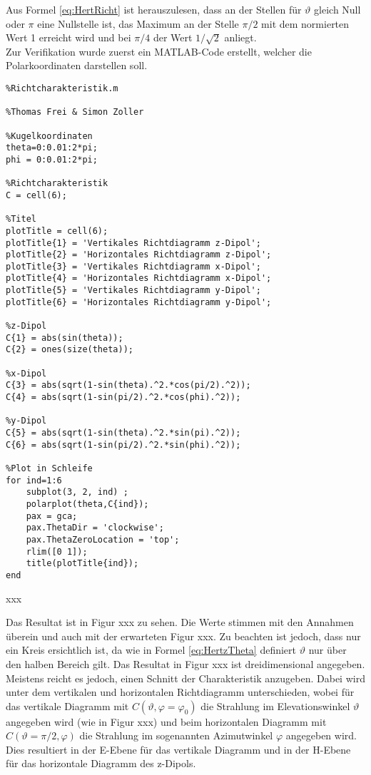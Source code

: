 Aus Formel \ref{eq:HertRicht} ist herauszulesen, dass an der Stellen für $\vartheta$ gleich Null oder $\pi$ eine Nullstelle ist, das Maximum an der Stelle $\pi/2$ mit dem normierten Wert 1 erreicht wird und bei $\pi/4$ der Wert $1/\sqrt{2}$ anliegt.\\

Zur Verifikation wurde zuerst ein MATLAB-Code erstellt, welcher die Polarkoordinaten darstellen soll.

\begin{lstlisting}
%Richtcharakteristik.m

%Thomas Frei & Simon Zoller

%Kugelkoordinaten
theta=0:0.01:2*pi;
phi = 0:0.01:2*pi;

%Richtcharakteristik
C = cell(6);

%Titel
plotTitle = cell(6);
plotTitle{1} = 'Vertikales Richtdiagramm z-Dipol';
plotTitle{2} = 'Horizontales Richtdiagramm z-Dipol';
plotTitle{3} = 'Vertikales Richtdiagramm x-Dipol';
plotTitle{4} = 'Horizontales Richtdiagramm x-Dipol';
plotTitle{5} = 'Vertikales Richtdiagramm y-Dipol';
plotTitle{6} = 'Horizontales Richtdiagramm y-Dipol';

%z-Dipol
C{1} = abs(sin(theta));
C{2} = ones(size(theta));

%x-Dipol
C{3} = abs(sqrt(1-sin(theta).^2.*cos(pi/2).^2));
C{4} = abs(sqrt(1-sin(pi/2).^2.*cos(phi).^2));

%y-Dipol
C{5} = abs(sqrt(1-sin(theta).^2.*sin(pi).^2));
C{6} = abs(sqrt(1-sin(pi/2).^2.*sin(phi).^2));

%Plot in Schleife
for ind=1:6
    subplot(3, 2, ind) ;
    polarplot(theta,C{ind});
    pax = gca;
    pax.ThetaDir = 'clockwise';
    pax.ThetaZeroLocation = 'top';
    rlim([0 1]);
    title(plotTitle{ind});
end
\end{lstlisting}

xxx

Das Resultat ist in Figur xxx zu sehen. Die Werte stimmen mit den Annahmen überein und auch mit der erwarteten Figur xxx. Zu beachten ist jedoch, dass nur ein Kreis ersichtlich ist, da wie in Formel \ref{eq:HertzTheta} definiert $\vartheta$ nur über den halben Bereich gilt. Das Resultat in Figur xxx ist dreidimensional angegeben. Meistens reicht es jedoch, einen Schnitt der Charakteristik anzugeben. Dabei wird unter dem vertikalen und horizontalen Richtdiagramm unterschieden, wobei für das vertikale Diagramm mit $C(\vartheta, \varphi = \varphi_0)$ die Strahlung im Elevationswinkel $\vartheta$ angegeben wird (wie in Figur xxx) und beim horizontalen Diagramm mit $C(\vartheta=\pi/2, \varphi)$ die Strahlung im sogenannten Azimutwinkel $\varphi$ angegeben wird. Dies resultiert in der E-Ebene für das vertikale Diagramm und in der H-Ebene für das horizontale Diagramm des z-Dipols.\\

